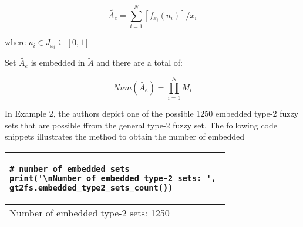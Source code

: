 \documentclass[]{article}
\begin{document}
\begin{equation}
\tilde{A_e} = \displaystyle \sum_{i=1}^{N} \left[ f_{x_{i}} (u_{i}) \right] / x_{i}
\end{equation}

where $u_{i} \in J_{x_{i}} \subseteq [0,1]$

Set $\tilde{A_e}$ is embedded in $\tilde{A}$ and there are a total of:

\begin{equation}
Num(\tilde{A_e}) = \displaystyle \prod_{i=1}^{N} M_i
\end{equation}

\bigskip

In Example 2, the authors depict one of the possible 1250 embedded type-2 fuzzy sets that are possible ffrom the general type-2 fuzzy set. The following code snippets illustrates the method to obtain the number of embedded

\bigskip

\begin{tabular}{|l|}
\hline 
\lstset{language=Python}
\lstset{basicstyle=\scriptsize}
\begin{lstlisting}
# number of embedded sets
print('\nNumber of embedded type-2 sets: ', 
gt2fs.embedded_type2_sets_count())
\end{lstlisting}
\\
\hline
{\small Number of embedded type-2 sets:  1250}\\
\hline 
\end{tabular} 

\bigskip
\end{document}
